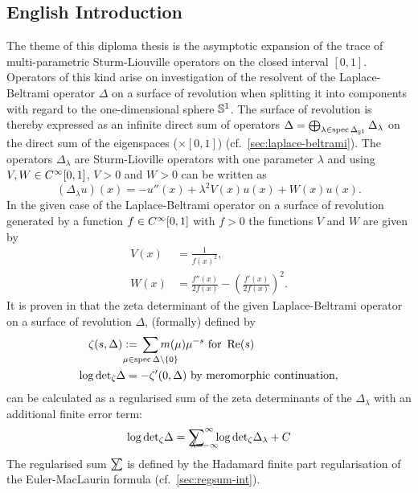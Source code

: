 \subsection{English Introduction}
The theme of this diploma thesis is the asymptotic expansion of the trace of
multi-parametric Sturm-Liouville operators on the closed interval $[0,1]$.
%
Operators of this kind arise on investigation of the resolvent of the
Laplace-Beltrami operator $\Delta$ on a surface of revolution when splitting it
into components with regard to the one-dimensional sphere ${\mathbb{S}^{1}}$. The
surface of revolution is thereby expressed as an infinite direct sum of
operators $\Delta =
\bigoplus_{\lambda\in\operatorname{spec}\Delta_{{\mathbb{S}^{1}}}}\Delta_\lambda$ on the
direct sum of the eigenspaces ($\times[0,1]$) (cf.\
\cref{sec:laplace-beltrami}).
%
The operators $\Delta_\lambda$ are Sturm-Lioville operators with one parameter
$\lambda$ and using $V,W\in C^\infty_{}{[0,1]}$, $V>0$ and $W>0$ can be written as
\begin{equation*}
  (\Delta_\lambda u)(x) = -u''(x) + \lambda^2 V(x) u(x) + W(x) u(x).
\end{equation*}
In the given case of the Laplace-Beltrami operator on a surface of revolution
generated by a function $f\in C^\infty_{}{[0,1]}$ with $f>0$ the functions $V$ and $W$
are given by
\begin{align*}
  V(x) &= \frac1{f(x)^2}, \\
  W(x) &= \frac{f''(x)}{2f(x)} - \left(\frac{f'(x)}{2f(x)}\right)^2.
\end{align*}
It is proven in \cite{LV13} that the zeta determinant of the given
Laplace-Beltrami operator on a surface of revolution $\Delta$, (formally)
defined by
\begin{align*}
  \zeta(s,\Delta) := {} &
  \sum_{\mathclap{\mu\in\operatorname{spec}\Delta\setminus\{0\}}}
  m(\mu)\mu^{-s} \text{ for } \Re(s) \\
  \log\zdet \Delta = {} & {-\zeta'}(0,\Delta) \text{ by meromorphic
continuation},
\end{align*}
can be calculated as a regularised sum of the zeta determinants of the
$\Delta_\lambda$ with an additional finite error term:
\begin{equation*}
  \log\zdet\Delta = \Regsum_{\mathclap{\lambda =
  -\infty}}^\infty\log\zdet\Delta_\lambda + C
\end{equation*}
The regularised sum $\slashed{\sum}$ is defined by the Hadamard finite part
regularisation of the Euler-MacLaurin formula (cf.\ \cref{sec:regsum-int}).

